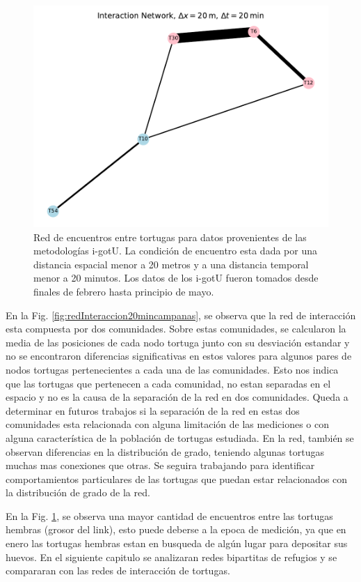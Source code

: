 \begin{figure}[ht]
    \begin{center}
       
   
    \includegraphics[width=\imsize]{Chap2/red_interaccion_20min_IGOTO.pdf}
\end{center}
    \caption[Red de encuentros entre tortugas utilizando i-gotU.]{Red de encuentros entre tortugas para datos provenientes de las metodologías i-gotU. La condición de encuentro esta dada por una distancia espacial menor a 20 metros y a una distancia temporal menor a 20 minutos. Los datos de los i-gotU fueron tomados desde finales de febrero hasta principio de mayo.}
    \label{fig:redInteraccion20igotu}
\end{figure}


En la Fig. \ref{fig:redInteraccion20mincampanas}, se observa que la red de interacción esta compuesta por dos comunidades. Sobre estas comunidades, se calcularon la media de las posiciones de cada nodo tortuga junto con su desviación estandar y no se encontraron diferencias significativas en estos valores para algunos pares de nodos tortugas pertenecientes a cada una de las comunidades. Esto nos indica que las tortugas que pertenecen a cada comunidad, no estan separadas en el espacio y no es la causa de la separación de la red en dos comunidades. Queda a determinar en futuros trabajos si la separación de la
red en estas dos comunidades esta relacionada con alguna limitación de las mediciones o con alguna característica de la población de tortugas estudiada. En la red, también se observan diferencias en la distribución de grado, teniendo algunas tortugas muchas mas conexiones que otras. Se seguira trabajando para identificar comportamientos particulares de las tortugas que puedan estar relacionados con la distribución de grado de la red.

En la Fig. \ref{fig:redInteraccion20igotu}, se observa una mayor cantidad de encuentros entre las tortugas hembras (grosor del link), esto puede deberse a la epoca de medición, ya que en enero las tortugas hembras estan en busqueda de algún lugar para depositar sus huevos. En el siguiente capitulo se analizaran redes bipartitas de refugios y se compararan con las redes de interacción de tortugas.

